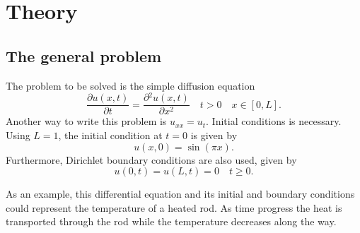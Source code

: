 \documentclass[a4paper,11pt,twocolumn]{article}
\begin{document}
\section{Theory}

\subsection{The general problem}

The problem to be solved is the simple diffusion equation
\begin{equation}
\frac{\partial u(x,t)}{\partial t}=\frac{\partial{^2}u(x,t)}{\partial x^2} \quad t>0 \quad x\in [0,L].
	\label{eq:diff}
\end{equation}
Another way to write this problem is $u_{xx} = u_t$. Initial conditions is necessary. Using $L=1$, the initial condition at $t=0$ is given by
\begin{equation}
    u(x,0) = \sin(\pi x)
    \label{eq:incond}.
\end{equation}
Furthermore, Dirichlet boundary conditions are also used, given by
\begin{equation*}
    u(0,t) = u(L,t) = 0 \quad t \geq 0.
\end{equation*}

As an example, this differential equation and its initial and boundary conditions could represent the temperature of a heated rod. As time progress the heat is transported through the rod while the temperature decreases along the way.
\end{document}
